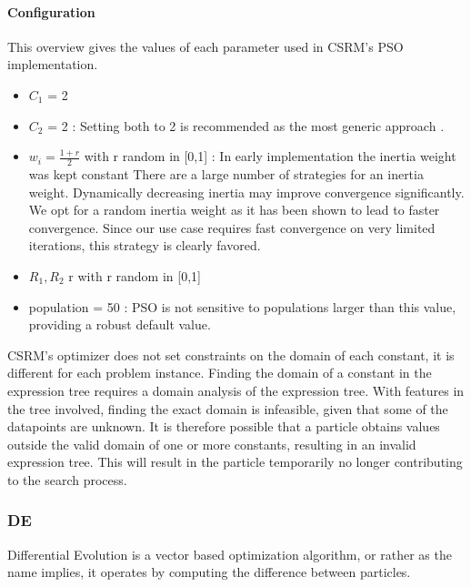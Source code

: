\paragraph{Configuration}
This overview gives the values of each parameter used in CSRM's PSO implementation.
\begin{itemize}
\item $C_1$ = 2 
\item $C_2$ = 2 : Setting both to 2 is recommended as the most generic approach \cite{PSOParameter}.
\item $w_i = \frac{1 + r}{2}$ with r random in [0,1] : In early implementation the inertia weight was kept constant \cite{PSOInertiaShi} There are a large number of strategies for an inertia weight. Dynamically decreasing inertia may improve convergence significantly. 
We opt for a random inertia weight as it has been shown \cite{PSOInertia} to lead to faster convergence. Since our use case requires fast convergence on very limited iterations, this strategy is clearly favored.

\item $R_1, R_2$ r with r random in [0,1]
\item population = 50 : PSO is not sensitive to populations larger than this value, providing a robust default value. \cite{SwarmIntelligence}
\end{itemize}
CSRM's optimizer does not set constraints on the domain of each constant, it is different for each problem instance. 
Finding the domain of a constant in the expression tree requires a domain analysis of the expression tree. With features in the tree involved, finding the exact domain is infeasible, given that some of the datapoints are unknown. It is therefore possible that a particle obtains values outside the valid domain of one or more constants, resulting in an invalid expression tree. This will result in the particle temporarily no longer contributing to the search process.

\subsubsection{DE}
Differential Evolution is a vector based optimization algorithm, or rather as the name implies, it operates by computing the difference between particles. 
